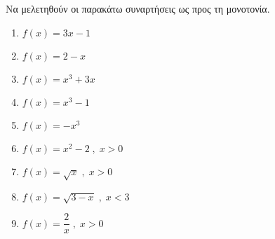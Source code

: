 Να μελετηθούν οι παρακάτω συναρτήσεις ως προς τη μονοτονία.
\begin{multicols}{3}
\begin{enumerate}[label=\roman*.,itemsep=0mm]
\item $ f(x)=3x-1 $
\item $ f(x)=2-x $
\item $ f(x)=x^3+3x $
\item $ f(x)=x^3-1 $
\item $ f(x)=-x^3 $
\item $ f(x)=x^2-2\;,\;x>0 $
\item $ f(x)=\sqrt{x}\;,\;x>0 $
\item $ f(x)=\sqrt{3-x}\;,\;x<3 $
\item $ f(x)=\dfrac{2}{x}\;,\;x>0 $
\end{enumerate}
\end{multicols}
